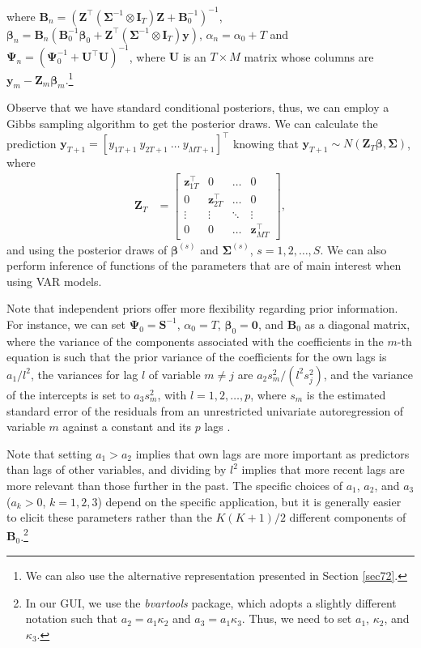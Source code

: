 where $\bm{B}_n=(\bm{Z}^{\top}(\bm{\Sigma}^{-1}\otimes \bm{I}_T )\bm{Z}+\bm{B}_0^{-1})^{-1}$, $\bm{\beta}_n=\bm{B}_n(\bm{B}_0^{-1}\bm{\beta}_0 + \bm{Z}^{\top}(\bm{\Sigma}^{-1}\otimes \bm{I}_T)\bm{y})$, $\alpha_n = \alpha_0 + T$ and $\bm{\Psi}_n = (\bm{\Psi}_0^{-1} + \bm{U}^{\top}\bm{U})^{-1}$, where $\bm{U}$ is an $T\times M$ matrix whose columns are $\bm{y}_m-\bm{Z}_m\bm{\beta}_m$.\footnote{We can also use the alternative representation presented in Section \ref{sec72}.}

Observe that we have standard conditional posteriors, thus, we can employ a Gibbs sampling algorithm to get the posterior draws. We can calculate the prediction $\bm{y}_{T+1}=[y_{1T+1} \ y_{2T+1} \ \dots \ y_{MT+1}]^{\top}$ knowing that $\bm{y}_{T+1}\sim N(\bm{Z}_{T}\bm{\beta},\bm{\Sigma})$, where \begin{align*}
	\bm{Z}_T&=\begin{bmatrix}
		\bm{z}_{1T}^{\top} & 0 & \dots & 0\\
		0 & \bm{z}_{2T}^{\top} & \dots & 0\\
		\vdots & \vdots & \ddots & \vdots\\
		0 & 0& \dots & \bm{z}_{MT}^{\top}		
	\end{bmatrix},
\end{align*} 
and using the posterior draws of $\bm{\beta}^{(s)}$ and $\bm{\Sigma}^{(s)}$, $s=1,2,\dots,S$. We can also perform inference of functions of the parameters that are of main interest when using VAR models.

Note that independent priors offer more flexibility regarding prior information. For instance, we can set $\bm{\Psi}_0 = \bm{S}^{-1}$, $\alpha_0 = T$, $\bm{\beta}_0 = \bm{0}$, and $\bm{B}_0$ as a diagonal matrix, where the variance of the components associated with the coefficients in the $m$-th equation is such that the prior variance of the coefficients for the own lags is $a_1/l^2$, the variances for lag $l$ of variable $m \neq j$ are $a_2s_{m}^2/(l^2 s_{j}^2)$, and the variance of the intercepts is set to $a_3 s_{m}^2$, with $l = 1, 2, \dots, p$, where $s_m$ is the estimated standard error of the residuals from an unrestricted univariate autoregression of variable $m$ against a constant and its $p$ lags \cite{litterman1986forecasting, koop2010bayesian}. 

Note that setting $a_1 > a_2$ implies that own lags are more important as predictors than lags of other variables, and dividing by $l^2$ implies that more recent lags are more relevant than those further in the past. The specific choices of $a_1$, $a_2$, and $a_3$ ($a_k > 0$, $k = 1, 2, 3$) depend on the specific application, but it is generally easier to elicit these parameters rather than the $K(K+1)/2$ different components of $\bm{B}_0$.\footnote{In our GUI, we use the \textit{bvartools} package, which adopts a slightly different notation such that $a_2 = a_1 \kappa_2$ and $a_3 = a_1 \kappa_3$. Thus, we need to set $a_1$, $\kappa_2$, and $\kappa_3$.}

